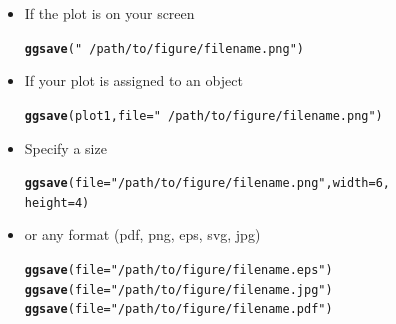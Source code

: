 \documentclass{beamer}\usepackage[]{graphicx}\usepackage[]{color}
\makeatletter
\newcommand{\hlstr}[1]{\textcolor[rgb]{0.192,0.494,0.8}{#1}}%
\newcommand{\hlkwd}[1]{\textcolor[rgb]{0.737,0.353,0.396}{\textbf{#1}}}%
\newenvironment{kframe}{%
 \def\at@end@of@kframe{}%
 \ifinner\ifhmode%
  \def\at@end@of@kframe{\end{minipage}}%
  \begin{minipage}{\columnwidth}%
 \fi\fi%
 \def\FrameCommand##1{\hskip\@totalleftmargin \hskip-\fboxsep
 \colorbox{shadecolor}{##1}\hskip-\fboxsep
     \hskip-\linewidth \hskip-\@totalleftmargin \hskip\columnwidth}%
 \MakeFramed {\advance\hsize-\width
   \@totalleftmargin\z@ \linewidth\hsize
   \@setminipage}}%
 {\par\unskip\endMakeFramed%
 \at@end@of@kframe}
\newenvironment{knitrout}{}{} %
\makeatother
\begin{document}


\begin{frame}[fragile]
\begin{itemize}
\item If the plot is on your screen
\begin{knitrout}\footnotesize
{}\color{fgcolor}\begin{kframe}
\begin{alltt}
\hlkwd{ggsave}(\hlstr{"~/path/to/figure/filename.png"})
\end{alltt}
\end{kframe}
\end{knitrout}

\item If your plot is assigned to an object
\begin{knitrout}\footnotesize
{}\color{fgcolor}\begin{kframe}
\begin{alltt}
\hlkwd{ggsave}(plot1, file = \hlstr{"~/path/to/figure/filename.png"})
\end{alltt}
\end{kframe}
\end{knitrout}


\item Specify a size
\begin{knitrout}\footnotesize
{}\color{fgcolor}\begin{kframe}
\begin{alltt}
\hlkwd{ggsave}(file = \hlstr{"/path/to/figure/filename.png"}, width = 6,
height =4)
\end{alltt}
\end{kframe}
\end{knitrout}

\item or any format (pdf, png, eps, svg, jpg)
\begin{knitrout}\footnotesize
{}\color{fgcolor}\begin{kframe}
\begin{alltt}
\hlkwd{ggsave}(file = \hlstr{"/path/to/figure/filename.eps"})
\hlkwd{ggsave}(file = \hlstr{"/path/to/figure/filename.jpg"})
\hlkwd{ggsave}(file = \hlstr{"/path/to/figure/filename.pdf"})
\end{alltt}
\end{kframe}
\end{knitrout}

\end{itemize}
\end{frame}
\end{document}
